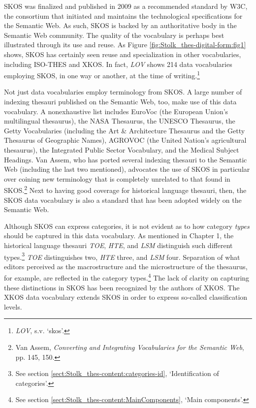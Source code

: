 SKOS was finalized and published in 2009 as a recommended standard by W3C, the consortium that initiated and maintains the technological specifications for the Semantic Web. As such, SKOS is backed by an authoritative body in the Semantic Web community. The quality of the vocabulary is perhaps best illustrated through its use and reuse. As Figure \ref{fig:Stolk_thes-digital-form:fig1} shows, SKOS has certainly seen reuse and specialization in other vocabularies, including ISO-THES and XKOS. In fact, \textit{LOV} shows 214 data vocabularies employing SKOS, in one way or another, at the time of writing.\footnote{\textit{LOV}, s.v. `skos'.} 

Not just data vocabularies employ terminology from SKOS. A large number of indexing thesauri published on the Semantic Web, too, make use of this data vocabulary. A nonexhaustive list includes EuroVoc (the European Union's multilingual thesaurus), the NASA Thesaurus, the UNESCO Thesaurus, the Getty Vocabularies (including the Art \& Architecture Thesaurus and the Getty Thesaurus of Geographic Names), AGROVOC (the United Nation's agricultural thesaurus), the Integrated Public Sector Vocabulary, and the Medical Subject Headings. 
Van Assem, who has ported several indexing thesauri to the Semantic Web (including the last two mentioned), advocates the use of SKOS in particular over coining new terminology that is completely unrelated to that found in SKOS.\footnote{Van Assem, \textit{Converting and Integrating Vocabularies for the Semantic Web}, pp. 145, 150.} Next to having good coverage for historical language thesauri, then, the SKOS data vocabulary is also a standard that has been adopted widely on the Semantic Web. %
%

Although SKOS can express categories, it is not evident as to how category \emph{types} should be captured in this data vocabulary. As mentioned in Chapter 1, the historical language thesauri \textit{TOE}, \textit{HTE}, and \textit{LSM} distinguish such different types.\footnote{See section \ref{sect:Stolk_thes-content:categories-id}, `Identification of categories'.} \textit{TOE} distinguishes two, \textit{HTE} three, and \textit{LSM} four. Separation of what editors perceived as the macrostructure and the microstructure of the thesaurus, for example, are reflected in the category types.\footnote{See section \ref{sect:Stolk_thes-content:MainComponents}, `Main components'.} The lack of clarity on capturing these distinctions in SKOS has been recognized by the authors of XKOS. The XKOS data vocabulary extends SKOS in order to express so-called classification levels.


